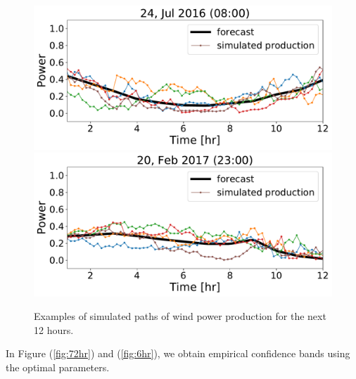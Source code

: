 \documentclass[ima, 25pt, portrait, plainboxedsections]{sciposter}
\begin{document}
\begin{multicols}{3}
 \begin{figure}[t]
 \begin{center}
    \includegraphics[width=1\linewidth]{simulated/12hr/622.pdf}  %
    \includegraphics[width=1\linewidth]{simulated/12hr/1124.pdf}
 \end{center}
    \caption{ Examples of simulated paths of wind power production for the next 12 hours.}
 \label{simulated_12hr}
 \end{figure}

 In Figure (\ref{fig:72hr}) and (\ref{fig:6hr}), we obtain empirical confidence bands using the optimal parameters.


\end{multicols}
\end{document}
